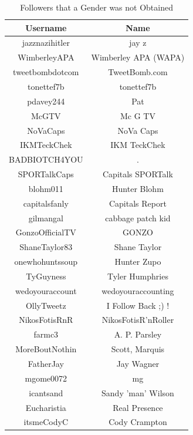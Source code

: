 \documentclass[12pt,letterpaper]{article}
\begin{document}
\begin{table}[ht!]
    \centering
    \begin{tabular}{|c|c|}\hline
    \textbf{Username} & \textbf{Name}  \\\hline
    jazznazihitler & jay z\\\hline 
    WimberleyAPA & Wimberley APA (WAPA)\\\hline 
    tweetbombdotcom & TweetBomb.com\\\hline 
    tonettef7b & tonettef7b\\\hline 
    pdavey244 & Pat\\\hline 
    McGTV & Mc G TV\\\hline 
    NoVaCaps & NoVa Caps\\\hline 
    IKMTeckChek & IKM TeckChek\\\hline 
    BADBIOTCH4YOU & .\\\hline 
    SPORTalkCaps & Capitals SPORTalk\\\hline 
    blohm011 & Hunter Blohm\\\hline 
    capitalsfanly & Capitals Report\\\hline 
    gilmangal & cabbage patch kid\\\hline 
    GonzoOfficialTV & GONZO\\\hline 
    ShaneTaylor83 & Shane Taylor\\\hline 
    onewhohuntssoup & Hunter Zupo\\\hline 
    TyGuyness & Tyler Humphries\\\hline 
    wedoyouraccount & wedoyouraccounting\\\hline 
    OllyTweetz & I Follow Back ;) !\\\hline 
    NikosFotisRnR & NikosFotisR'nRoller\\\hline 
    farmc3 & A. P. Parsley\\\hline 
    MoreBoutNothin & Scott, Marquis\\\hline 
    FatherJay & Jay Wagner\\\hline 
    mgome0072 & mg\\\hline 
    icantsand & Sandy 'man' Wilson\\\hline 
    Eucharistia & Real Presence\\\hline 
    itsmeCodyC & Cody Crampton\\\hline 
    \end{tabular}
    \caption{Followers that a Gender was not Obtained}
    \label{tab:my_label}
\end{table}
\newpage 
\end{document}
